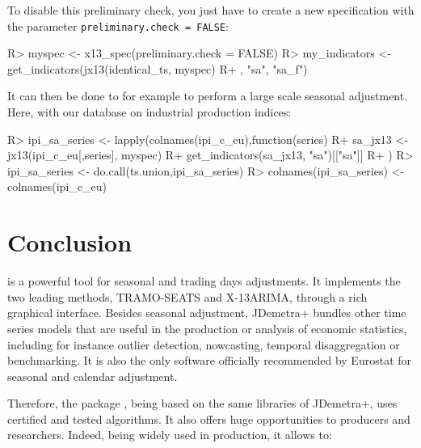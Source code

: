 \documentclass[article]{jss}
\begin{document}
To disable this preliminary check, you just have to create a new
specification with the parameter \texttt{preliminary.check\ =\ FALSE}:

\begin{CodeChunk}

\begin{CodeInput}
R> myspec <- x13_spec(preliminary.check = FALSE)
R> my_indicators <- get_indicators(jx13(identical_ts, myspec)
R+                                 , "sa", "sa_f")
\end{CodeInput}
\end{CodeChunk}

It can then be done to for example to perform a large scale seasonal
adjustment. Here, with our database on industrial production indices:

\begin{CodeChunk}

\begin{CodeInput}
R> ipi_sa_series <- lapply(colnames(ipi_c_eu),function(series){
R+   sa_jx13 <- jx13(ipi_c_eu[,series], myspec)
R+   get_indicators(sa_jx13, "sa")[["sa"]]
R+ })
R> ipi_sa_series <- do.call(ts.union,ipi_sa_series)
R> colnames(ipi_sa_series) <- colnames(ipi_c_eu)
\end{CodeInput}
\end{CodeChunk}

\hypertarget{conclusion}{%
\section{Conclusion}\label{conclusion}}

 is a powerful tool for seasonal and trading days
adjustments. It implements the two leading methods, TRAMO-SEATS and
X-13ARIMA, through a rich graphical interface. Besides seasonal
adjustment, JDemetra+ bundles other time series models that are useful
in the production or analysis of economic statistics, including for
instance outlier detection, nowcasting, temporal disaggregation or
benchmarking. It is also the only software officially recommended by
Eurostat for seasonal and calendar adjustment.

Therefore, the package , being based on the same
libraries of JDemetra+, uses certified and tested algorithms. It also
offers huge opportunities to producers and researchers. Indeed,
 being widely used in production, it allows to:
\end{document}
